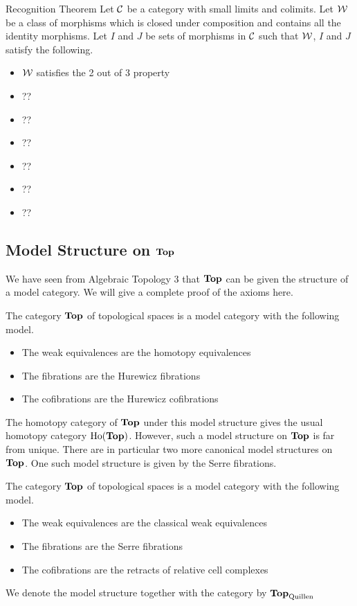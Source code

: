 \documentclass[a4paper]{article}
\begin{document}
\begin{thm}{Recognition Theorem}{} Let $\mathcal{C}$ be a category with small limits and colimits. Let $\mathcal{W}$ be a class of morphisms which is closed under composition and contains all the identity morphisms. Let $I$ and $J$ be sets of morphisms in $\mathcal{C}$ such that $\mathcal{W}$, $I$ and $J$ satisfy the following. 
\begin{itemize}
\item $\mathcal{W}$ satisfies the 2 out of 3 property
\item ??
\item ??
\item ??
\item ??
\item ??
\item ??
\end{itemize}
\end{thm}

\subsection{Model Structure on $\bold{Top}$}
We have seen from Algebraic Topology 3 that $\bold{Top}$ can be given the structure of a model category. We will give a complete proof of the axioms here. 

\begin{thm}{}{} The category $\bold{Top}$ of topological spaces is a model category with the following model. 
\begin{itemize}
\item The weak equivalences are the homotopy equivalences
\item The fibrations are the Hurewicz fibrations
\item The cofibrations are the Hurewicz cofibrations
\end{itemize}
\end{thm}

The homotopy category of $\bold{Top}$ under this model structure gives the usual homotopy category $\text{Ho}(\bold{Top})$. However, such a model structure on $\bold{Top}$ is far from unique. There are in particular two more canonical model structures on $\bold{Top}$. One such model structure is given by the Serre fibrations. 

\begin{thm}{}{} The category $\bold{Top}$ of topological spaces is a model category with the following model. 
\begin{itemize}
\item The weak equivalences are the classical weak equivalences
\item The fibrations are the Serre fibrations
\item The cofibrations are the retracts of relative cell complexes
\end{itemize}
We denote the model structure together with the category by $\bold{Top}_\text{Quillen}$
\end{thm}
\end{document}
